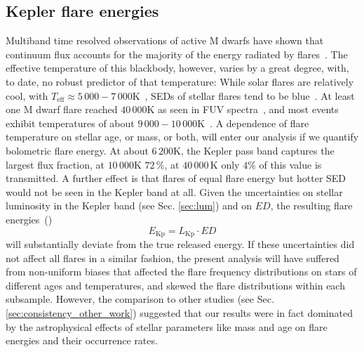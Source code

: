 \documentclass{aa}
\begin{document}
\subsection{Kepler flare energies}
Multiband time resolved observations of active M dwarfs have shown that continuum flux accounts for the majority  of the energy radiated by flares~\citep{kowalski_time-resolved_2013}. %
The effective temperature of this blackbody, however, varies by a great degree, with, to date, no robust predictor of that temperature:
While solar flares are relatively cool, with \mbox{$T_\mathrm{eff}\approx5\,000-7\,000 $\;K}~\citep{kleint_solarstellarwlf_2016, kerr_solarstellarwlf_2014, watanabe_solarstellarwlf_2013, namekata_solarstellarwlf_2017}, SEDs of stellar flares tend to be blue~\citep{davenport_multi-wavelength_2012}. At least one M dwarf flare reached $40\,000$\;K as seen in FUV spectra~\citep{froning_40000_2019}, and most events exhibit temperatures of about $9\,000-10\,000$\;K~\citep{1992ApJS...78..565H, kretzschmar_sun_2011, shibayama_superflares_2013}. 
A dependence of flare temperature on stellar age, or mass, or both, will enter our analysis if we quantify bolometric flare energy. At about $6\,200$\;K, the Kepler pass band captures the largest flux fraction, at $10\,000$\;K $72\,\%$, at $40\,000$\,K only $4\%$ of this value is transmitted. A further effect is that flares of equal flare energy but hotter SED would not be seen in the Kepler band at all. Given the uncertainties on stellar luminosity in the Kepler band (see Sec. \ref{sec:lum}) and on $ED$, the resulting flare energies~()
\begin{equation}
E_\mathrm{Kp} = L_\mathrm{Kp} \cdot ED
\end{equation}  
will substantially deviate from the true released energy. If these uncertainties did not affect all flares in a similar fashion, the present analysis will have suffered from non-uniform biases that affected the flare frequency distributions on stars of different ages and temperatures, and skewed the flare distributions within each subsample. However, the comparison to other studies (see Sec. \ref{sec:consistency_other_work}) suggested that our results were in fact dominated by the astrophysical effects of stellar parameters like mass and age on flare energies and their occurrence rates.  
\end{document}
